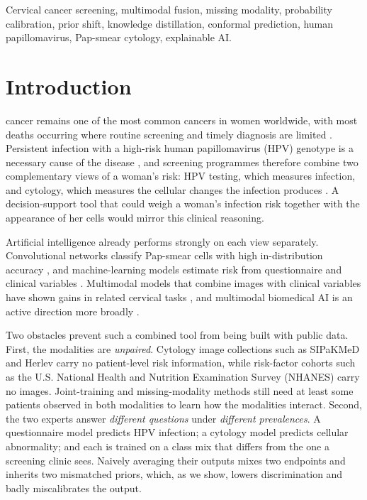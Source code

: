\documentclass[lettersize,journal]{IEEEtran}
\begin{document}
\begin{IEEEkeywords}
Cervical cancer screening, multimodal fusion, missing modality, probability calibration, prior shift, knowledge distillation, conformal prediction, human papillomavirus, Pap-smear cytology, explainable AI.
\end{IEEEkeywords}

\section{Introduction}
 cancer remains one of the most common cancers in women worldwide, with most deaths occurring where routine screening and timely diagnosis are limited \cite{WHO_cervical_cancer}. Persistent infection with a high-risk human papillomavirus (HPV) genotype is a necessary cause of the disease \cite{walboomers1999hpv}, and screening programmes therefore combine two complementary views of a woman's risk: HPV testing, which measures infection, and cytology, which measures the cellular changes the infection produces \cite{WHO_screening_guideline}. A decision-support tool that could weigh a woman's infection risk together with the appearance of her cells would mirror this clinical reasoning.

Artificial intelligence already performs strongly on each view separately. Convolutional networks classify Pap-smear cells with high in-distribution accuracy \cite{zhang2017deeppap,tan2024cervical,youneszade2023deep}, and machine-learning models estimate risk from questionnaire and clinical variables \cite{fernandes2017cervical,sun2022stacking,chadaga2022predicting}. Multimodal models that combine images with clinical variables have shown gains in related cervical tasks \cite{das2026topoticerv,wang2025cervipro,sha2024cervifusionnet}, and multimodal biomedical AI is an active direction more broadly \cite{acosta2022multimodal,baltrusaitis2019multimodal}.

Two obstacles prevent such a combined tool from being built with public data. First, the modalities are \emph{unpaired}. Cytology image collections such as SIPaKMeD \cite{plissiti2018sipakmed} and Herlev \cite{jantzen2005herlev} carry no patient-level risk information, while risk-factor cohorts such as the U.S. National Health and Nutrition Examination Survey (NHANES) \cite{nhanes} carry no images. Joint-training and missing-modality methods \cite{havaei2016hemis,yao2024drfuse,wu2026deep} still need at least some patients observed in both modalities to learn how the modalities interact. Second, the two experts answer \emph{different questions} under \emph{different prevalences}. A questionnaire model predicts HPV infection; a cytology model predicts cellular abnormality; and each is trained on a class mix that differs from the one a screening clinic sees. Naively averaging their outputs mixes two endpoints and inherits two mismatched priors, which, as we show, lowers discrimination and badly miscalibrates the output.
\end{document}
